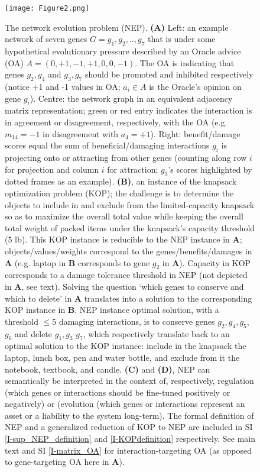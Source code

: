 \documentclass[12pt]{article}
\begin{document}
\begin{figure}[H]%
    \centering
    \texttt{[image: Figure2.png]} %
    \caption{
                The network evolution problem (NEP).
                \textbf{(A)} Left: an example network of seven genes $G={g_1,g_2, .., g_7}$ that is under some hypothetical evolutionary pressure described by an Oracle advice (OA) $A=(0,+1,-1,+1,0,0,-1)$. The OA is indicating that genes $g_2,g_4$ and $g_3,g_7$ should be promoted and inhibited respectively (notice +1 and -1 values in OA;  $a_i\in A$ is the Oracle's opinion on gene $g_i$). Centre: the network graph in an equivalent adjacency matrix representation; green or red entry indicates the interaction is in agreement or disagreement, respectively,  with the OA (e.g. $m_{14}=-1$ in disagreement with $a_4=+1$). Right: benefit/damage scores equal the sum of beneficial/damaging interactions $g_i$ is projecting onto or attracting from other genes (counting along row $i$ for projection and column $i$ for attraction; $g_3$'s scores  highlighted by dotted frames as an example).
                \textbf{(B)}, an instance of the knapsack optimization problem (KOP); the challenge is to determine the objects to include in and exclude from the limited-capacity knapsack so as to maximize the overall total value while keeping the overall total weight of packed items under the knapsack's capacity threshold (5 lb). This KOP instance is reducible to the NEP instance in \textbf{A}; objects/values/weights correspond to the genes/benefits/damages in \textbf{A}  (e.g. laptop in \textbf{B} corresponds to gene $g_2$ in \textbf{A}). Capacity in KOP corresponds to a damage tolerance threshold in NEP (not depicted in \textbf{A}, see text). Solving the question `which genes to conserve and which to delete' in \textbf{A} translates into a solution to the corresponding KOP instance in \textbf{B}. NEP instance optimal solution, with a threshold $\leq$5 damaging interactions, is to conserve genes $g_2, g_4,  g_5$, $g_6$ and delete $g_1, g_3$  $g_7$, which respectively translate back to an optimal solution to the KOP instance: include in the knapsack the laptop, lunch box, pen and water bottle, and exclude from it the notebook, textbook, and candle.
                \textbf{(C)} and \textbf{(D)}, NEP can semantically be interpreted in the context of, respectively,  regulation (which genes or interactions should be fine-tuned positively or negatively) or (evolution (which genes or interactions represent an asset or a liability to the system long-term). The formal definition of NEP and a generalized reduction of KOP to NEP are included in SI \ref{I-sup_NEP_definition} and \ref{I-KOPdefinition} respectively. See main text and SI \ref{I-matrix_OA} for interaction-targeting OA (as opposed to gene-targeting OA here in \textbf{A}). }
    \label{fig:intro_fancy}
    \end{figure}
\end{document}
